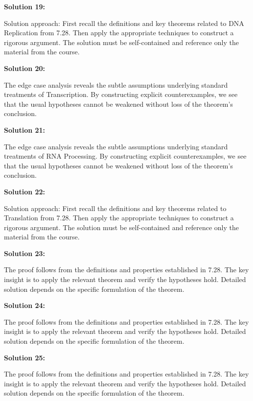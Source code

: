 \documentclass[12pt,a4paper]{exam}
\begin{document}
\vspace{0.5cm}

\textbf{Solution 19:}

Solution approach: First recall the definitions and key theorems related to DNA Replication from 7.28. Then apply the appropriate techniques to construct a rigorous argument. The solution must be self-contained and reference only the material from the course.

\vspace{0.5cm}

\textbf{Solution 20:}

The edge case analysis reveals the subtle assumptions underlying standard treatments of Transcription. By constructing explicit counterexamples, we see that the usual hypotheses cannot be weakened without loss of the theorem's conclusion.

\vspace{0.5cm}

\textbf{Solution 21:}

The edge case analysis reveals the subtle assumptions underlying standard treatments of RNA Processing. By constructing explicit counterexamples, we see that the usual hypotheses cannot be weakened without loss of the theorem's conclusion.

\vspace{0.5cm}

\textbf{Solution 22:}

Solution approach: First recall the definitions and key theorems related to Translation from 7.28. Then apply the appropriate techniques to construct a rigorous argument. The solution must be self-contained and reference only the material from the course.

\vspace{0.5cm}

\textbf{Solution 23:}

The proof follows from the definitions and properties established in 7.28. The key insight is to apply the relevant theorem and verify the hypotheses hold. Detailed solution depends on the specific formulation of the theorem.

\vspace{0.5cm}

\textbf{Solution 24:}

The proof follows from the definitions and properties established in 7.28. The key insight is to apply the relevant theorem and verify the hypotheses hold. Detailed solution depends on the specific formulation of the theorem.

\vspace{0.5cm}

\textbf{Solution 25:}

The proof follows from the definitions and properties established in 7.28. The key insight is to apply the relevant theorem and verify the hypotheses hold. Detailed solution depends on the specific formulation of the theorem.

\vspace{0.5cm}
\end{document}
